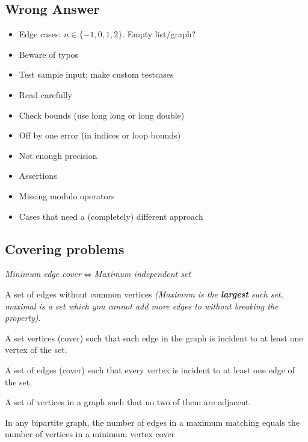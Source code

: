 \documentclass{article}
\begin{document}
\subsection{Wrong Answer}

\begin{itemize}
	\setlength\itemsep{-.25em}
	\item Edge cases: $n\in\{-1,0,1,2\}$. Empty list/graph?
	\item Beware of typos
	\item Test sample input; make custom testcases
	\item Read carefully
	\item Check bounds (use long long or long double)
	\item Off by one error (in indices or loop bounds)
	\item Not enough precision
	\item Assertions
	\item Missing modulo operators
	\item Cases that need a (completely) different approach
\end{itemize}

\subsection{Covering problems}

\begin{center}
	\emph{Minimum edge cover$\iff$Maximum independent set}
\end{center}

\begin{description}
	\setlength\itemsep{-.25em}
	\item[Matching]
		A set of edges without common vertices \textit{(Maximum is the \textbf{largest} such set, maximal is a set which you cannot add more edges to without breaking the property)}.
	\item[Minimum Vertex Cover]
		A set vertices (cover) such that each edge in the graph is incident to at least one vertex of the set.
	\item[Minimum Edge Cover]
		A set of edges (cover) such that every vertex is incident to at least one edge of the set.
	\item[Maximum Independent Set]
		A set of vertices in a graph such that no two of them are adjacent.
	\item[K\"{o}nig's theorem]
		In any bipartite graph, the number of edges in a maximum matching equals the number of vertices in a minimum vertex cover
\end{description}
\end{document}
